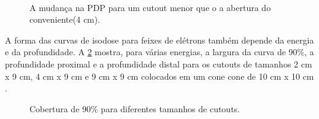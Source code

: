\documentclass[11pt,a4paper]{article}
\begin{document}
	\begin{figure}[h]
		\centering
		 \\ %
		\caption{A mudança na PDP para um cutout menor que o a abertura do conveniente(4 cm).}
		\label{fig:cutout}
	\end{figure}

	A forma das curvas de isodose para feixes de elétrons também depende da energia e da profundidade. A \ref{fig:cobertura90cutouts} mostra, para várias energias, a largura da curva de 90\%, a profundidade proximal e a profundidade distal para os cutouts de tamanhos 2 cm x 9 cm, 4 cm x 9 cm e 9 cm x 9 cm colocados em um cone cone de 10 cm x 10 cm .
	
	\begin{figure}[h]
		\centering
		\caption{Cobertura de 90\% para diferentes tamanhos de cutouts.}
		\label{fig:cobertura90cutouts}
	\end{figure}
	
\end{document}
